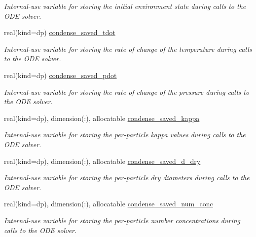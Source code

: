 \begin{DoxyCompactItemize}
\begin{DoxyCompactList}\small\item\em Internal-\/use variable for storing the initial environment state during calls to the O\+DE solver. \end{DoxyCompactList}\item 
real(kind=dp) \mbox{\hyperlink{namespacepmc__condense_a0a1155d88faa2b061fd371090165aad1}{condense\+\_\+saved\+\_\+tdot}}
\begin{DoxyCompactList}\small\item\em Internal-\/use variable for storing the rate of change of the temperature during calls to the O\+DE solver. \end{DoxyCompactList}\item 
real(kind=dp) \mbox{\hyperlink{namespacepmc__condense_a5bdbeab5c023573ed2f0a37bfa718f83}{condense\+\_\+saved\+\_\+pdot}}
\begin{DoxyCompactList}\small\item\em Internal-\/use variable for storing the rate of change of the pressure during calls to the O\+DE solver. \end{DoxyCompactList}\item 
real(kind=dp), dimension(\+:), allocatable \mbox{\hyperlink{namespacepmc__condense_a0829dc0e51b0c9843bfd0e3c36432a19}{condense\+\_\+saved\+\_\+kappa}}
\begin{DoxyCompactList}\small\item\em Internal-\/use variable for storing the per-\/particle kappa values during calls to the O\+DE solver. \end{DoxyCompactList}\item 
real(kind=dp), dimension(\+:), allocatable \mbox{\hyperlink{namespacepmc__condense_a30c34390a80570ea680b53c2ab971b50}{condense\+\_\+saved\+\_\+d\+\_\+dry}}
\begin{DoxyCompactList}\small\item\em Internal-\/use variable for storing the per-\/particle dry diameters during calls to the O\+DE solver. \end{DoxyCompactList}\item 
real(kind=dp), dimension(\+:), allocatable \mbox{\hyperlink{namespacepmc__condense_ae5922bfbd484efd47db5593f15d0c0f4}{condense\+\_\+saved\+\_\+num\+\_\+conc}}
\begin{DoxyCompactList}\small\item\em Internal-\/use variable for storing the per-\/particle number concentrations during calls to the O\+DE solver. \end{DoxyCompactList}\item 

\end{DoxyCompactItemize}
